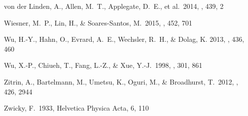 \documentclass[apj]{emulateapj}
\begin{document}
\begin{thebibliography}{42}
 von der Linden, A., Allen, M.~T., Applegate, D.~E., et al.\ 2014, \mnras, 439, 2 

 Wiesner, M.~P., Lin, H., \& Soares-Santos, M.\ 2015, \mnras, 452, 701 

 Wu, H.-Y., Hahn, O., Evrard, A.~E., Wechsler, R.~H., \& Dolag, K. 2013, \mnras, 436, 460 

 Wu, X.-P., Chiueh, T., Fang, L.-Z., \& Xue, Y.-J.\ 1998, \mnras, 301, 861 

 Zitrin, A., Bartelmann, M., Umetsu, K., Oguri, M., \& Broadhurst, T.\ 2012, \mnras, 426, 2944 

 Zwicky, F.\ 1933, Helvetica Physica Acta, 6, 110 

\end{thebibliography}
\end{document}
